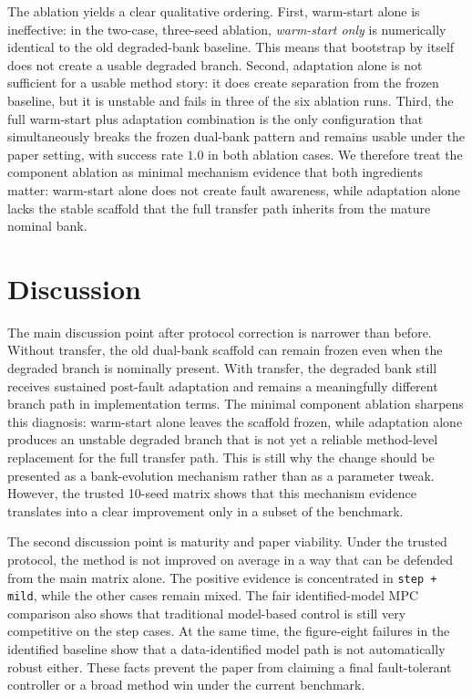 \documentclass[12pt,a4paper]{article}
\begin{document}
The ablation yields a clear qualitative ordering. First, warm-start alone is ineffective: in the two-case, three-seed ablation, \textit{warm-start only} is numerically identical to the old degraded-bank baseline. This means that bootstrap by itself does not create a usable degraded branch. Second, adaptation alone is not sufficient for a usable method story: it does create separation from the frozen baseline, but it is unstable and fails in three of the six ablation runs. Third, the full warm-start plus adaptation combination is the only configuration that simultaneously breaks the frozen dual-bank pattern and remains usable under the paper setting, with success rate $1.0$ in both ablation cases. We therefore treat the component ablation as minimal mechanism evidence that both ingredients matter: warm-start alone does not create fault awareness, while adaptation alone lacks the stable scaffold that the full transfer path inherits from the mature nominal bank.

\section{Discussion}

The main discussion point after protocol correction is narrower than before. Without transfer, the old dual-bank scaffold can remain frozen even when the degraded branch is nominally present. With transfer, the degraded bank still receives sustained post-fault adaptation and remains a meaningfully different branch path in implementation terms. The minimal component ablation sharpens this diagnosis: warm-start alone leaves the scaffold frozen, while adaptation alone produces an unstable degraded branch that is not yet a reliable method-level replacement for the full transfer path. This is still why the change should be presented as a bank-evolution mechanism rather than as a parameter tweak. However, the trusted 10-seed matrix shows that this mechanism evidence translates into a clear improvement only in a subset of the benchmark.

The second discussion point is maturity and paper viability. Under the trusted protocol, the method is not improved on average in a way that can be defended from the main matrix alone. The positive evidence is concentrated in \texttt{step + mild}, while the other cases remain mixed. The fair identified-model MPC comparison also shows that traditional model-based control is still very competitive on the step cases. At the same time, the figure-eight failures in the identified baseline show that a data-identified model path is not automatically robust either. These facts prevent the paper from claiming a final fault-tolerant controller or a broad method win under the current benchmark.
\end{document}
